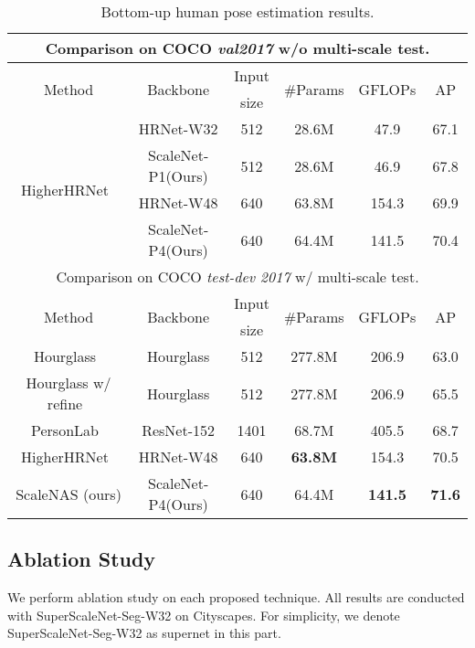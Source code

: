 \documentclass[final]{cvpr}
\newcommand{\netname}{ScaleNet\xspace}
\newcommand{\supernet}{SuperScaleNet\xspace}
\begin{document}
\begin{table}
\centering
\caption{Bottom-up human pose estimation results.} 
\setlength{\tabcolsep}{2pt}
\footnotesize
\begin{tabular}{c||c|c|c|c|c} 

\hline
\multicolumn{6}{c}{Comparison on COCO \textit{val2017} w/o multi-scale test.} \\
\hline
\multirow{2}{*}{Method} & \multirow{2}{*}{Backbone} & Input  & \multirow{2}{*}{\#Params} & \multirow{2}{*}{GFLOPs} & \multirow{2}{*}{AP} \\
                  &   & size  &  &   &  \\
\hline
\multirow{4}{*}{HigherHRNet~\cite{cheng2020higherhrnet}}& HRNet-W32  & 512  & 28.6M & 47.9 & 67.1 \\
& \netname-P1(Ours) & 512 & 28.6M & 46.9 & 67.8  \\
& HRNet-W48  & 640  & 63.8M & 154.3 & 69.9 \\
& \netname-P4(Ours) & 640 & 64.4M & 141.5 & 70.4 \\
\hline \hline
\multicolumn{6}{c}{Comparison on COCO \textit{test-dev 2017} w/ multi-scale test.} \\
\hline
\multirow{2}{*}{Method} & \multirow{2}{*}{Backbone} & Input  & \multirow{2}{*}{\#Params} & \multirow{2}{*}{GFLOPs} & \multirow{2}{*}{AP} \\
                  &   & size  &  &   &  \\
\hline
Hourglass~\cite{newell2017associative} & Hourglass & 512 & 277.8M& 206.9 &63.0 \\
Hourglass w/ refine~\cite{newell2017associative} & Hourglass & 512 & 277.8M & 206.9 &65.5 \\
PersonLab~\cite{papandreou2018personlab}  & ResNet-152 & 1401 & 68.7M & 405.5 &68.7 \\
HigherHRNet~\cite{cheng2020higherhrnet}& HRNet-W48 & 640 & \textbf{63.8M} & 154.3 & 70.5 \\
ScaleNAS (ours) & \netname-P4(Ours) & 640 & 64.4M & \textbf{141.5} & \textbf{71.6} \\
\hline
\end{tabular}
\label{tab:pose_bottom_up}
\end{table}


\subsection{Ablation Study}
We perform ablation study on each proposed technique.
All results are conducted with \supernet-Seg-W32 on Cityscapes. For simplicity, we denote \supernet-Seg-W32 as supernet in this part.
\end{document}
